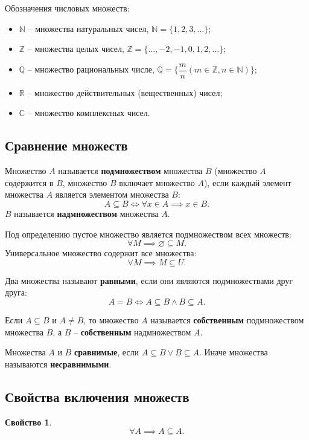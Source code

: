 \documentclass[a5paper, 11pt]{extarticle}
\theoremstyle{definition}
\newtheorem{property}{Свойство}[subsection]
\theoremstyle{definition}
\theoremstyle{definition}
\numberwithin{figure}{section}
\numberwithin{table}{section}
\begin{document}
Обозначения числовых множеств:
\begin{itemize}
    \item \(\mathbb{N}\) -- множества натуральных чисел, \(\mathbb{N} = \{1, 2, 3, \ldots\}\);
    \item \(\mathbb{Z}\) -- множества целых чисел, \(\mathbb{Z} = \{\ldots, -2, -1, 0, 1, 2, \ldots\}\);
    \item \(\mathbb{Q}\) -- множество рациональных числе, \(\mathbb{Q} = \Big\{\dfrac{m}{n} (m \in \mathbb{Z}, n \in \mathbb{N})\Big\}\);
    \item \(\mathbb{R}\) -- множество действительных (вещественных) чисел;
    \item \(\mathbb{C}\) -- множество комплексных чисел.
\end{itemize}

\subsection{Сравнение множеств}

Множество \(A\) называется \textbf{подмножеством} множества \(B\) (множество \(A\) содержится в \(B\), множество \(B\) включает множество \(A\)), если каждый элемент множества \(A\) является элементом множества \(B\):
\[
    A \subseteq B
    \iff
    \forall x \in A \implies x \in B.
\]
\(B\) называется \textbf{надмножеством} множества \(A\).

Под определению пустое множество является подмножеством всех множеств:
\[
    \forall M \implies \varnothing \subseteq M.
\]
Универсальное множество содержит все множества:
\[
    \forall M \implies M \subseteq U.
\]

Два множества называют \textbf{равными}, если они являются подмножествами друг друга:
\[
    A = B
    \iff
    A \subseteq B \land B \subseteq A.
\]

Если \(A \subseteq B\) и \(A \neq B\), то множество \(A\) называется \textbf{собственным} подмножеством множества \(B\), а \(B\) -- \textbf{собственным} надмножеством \(A\).

Множества \(A\) и \(B\) \textbf{сравнимые}, если \(A \subseteq B \lor B \subseteq A\). Иначе множества называются \textbf{несравнимыми}.

\subsection{Свойства включения множеств}

\begin{property}
    \[
        \forall A \implies A \subseteq A.
    \]
\end{property}
\end{document}
